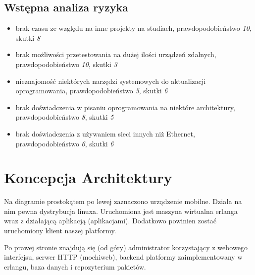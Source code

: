 \documentclass[polish,12pt]{aghthesis}
\begin{document}
\subsection{Wstępna analiza ryzyka}
\begin{itemize}
\item brak czasu ze względu na inne projekty na studiach, prawdopodobieństwo \emph{10}, skutki \emph{8}
\item brak możliwości przetestowania na dużej ilości urządzeń zdalnych, prawdopodobieństwo \emph{10}, skutki \emph{3}
\item nieznajomość niektórych narzędzi systemowych do aktualizacji oprogramowania, prawdopodobieństwo \emph{5}, skutki \emph{6}
\item brak doświadczenia w pisaniu oprogramowania na niektóre architektury, prawdopodobieństwo \emph{8}, skutki \emph{5}
\item brak doświadczenia z używaniem sieci innych niż Ethernet, prawdopodobieństwo \emph{6}, skutki \emph{6}
\end{itemize}

\section{Koncepcja Architektury}

\centerline{
}

Na diagramie prostokątem po lewej zaznaczono urządzenie mobilne. Działa na nim pewna dystrybucja linuxa. Uruchomiona jest maszyna wirtualna erlanga wraz z działającą aplikacją (aplikacjami). Dodatkowo powinien zostać uruchomiony klient naszej platformy.

Po prawej stronie znajdują się (od góry) administrator korzystający z webowego interfejsu, serwer HTTP (mochiweb), backend platformy zaimplementowany w erlangu, baza danych i repozyterium pakietów.
\end{document}

